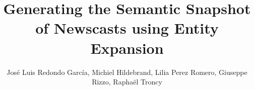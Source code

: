 \documentclass{llncs}
\begin{document}
\frontmatter          %
\pagestyle{headings}  %
\mainmatter              %

\title{Generating the Semantic Snapshot of Newscasts using Entity Expansion}
\author{Jos\'e Luis Redondo Garc\'ia, Michiel Hildebrand, Lilia Perez Romero, Giuseppe Rizzo, Rapha\"el Troncy}

\maketitle              %

\end{document}
